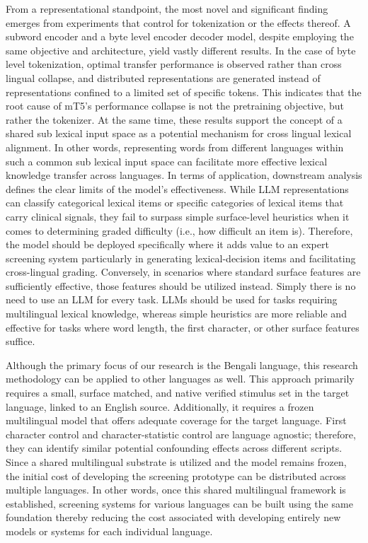 \documentclass[preprint,12pt]{elsarticle}
\begin{document}
From a representational standpoint, the most novel and significant finding emerges from experiments that control for tokenization or the effects thereof. A subword encoder and a byte level encoder decoder model, despite employing the same objective and architecture, yield vastly different results. In the case of byte level tokenization, optimal transfer performance is observed rather than cross lingual collapse, and distributed representations are generated instead of representations confined to a limited set of specific tokens. This indicates that the root cause of mT5's performance collapse is not the pretraining objective, but rather the tokenizer. At the same time, these results support the concept of a shared sub lexical input space as a potential mechanism for cross lingual lexical alignment. In other words, representing words from different languages within such a common sub lexical input space can facilitate more effective lexical knowledge transfer across languages. In terms of application, downstream analysis defines the clear limits of the model's effectiveness. While LLM representations can classify categorical lexical items or specific categories of lexical items that carry clinical signals, they fail to surpass simple surface-level heuristics when it comes to determining graded difficulty (i.e., how difficult an item is). Therefore, the model should be deployed specifically where it adds value to an expert screening system particularly in generating lexical-decision items and facilitating cross-lingual grading. Conversely, in scenarios where standard surface features are sufficiently effective, those features should be utilized instead. Simply there is no need to use an LLM for every task. LLMs should be used for tasks requiring multilingual lexical knowledge, whereas simple heuristics are more reliable and effective for tasks where word length, the first character, or other surface features suffice.

Although the primary focus of our research is the Bengali language, this research methodology can be applied to other languages as well. This approach primarily requires a small, surface matched, and native verified stimulus set in the target language, linked to an English source. Additionally, it requires a frozen multilingual model that offers adequate coverage for the target language. First character control and character-statistic control are language agnostic; therefore, they can identify similar potential confounding effects across different scripts. Since a shared multilingual substrate is utilized and the model remains frozen, the initial cost of developing the screening prototype can be distributed across multiple languages. In other words, once this shared multilingual framework is established, screening systems for various languages can be built using the same foundation thereby reducing the cost associated with developing entirely new models or systems for each individual language.
\end{document}
